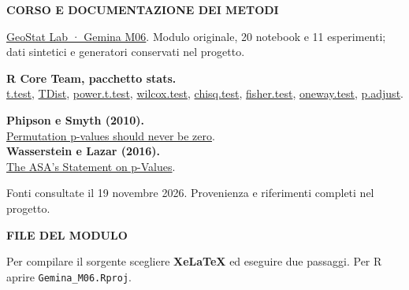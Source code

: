 \documentclass[12pt,aspectratio=1610]{beamer}
\newcommand{\PLabel}[1]{\par{\color{Classical}\bfseries\fontsize{9}{11}\selectfont\MakeUppercase{#1}}\par\vspace{1.8mm}}
\newcommand{\PBody}[1]{\par{\fontsize{11.3}{14.8}\selectfont #1\par}}
\newcommand{\PSmall}[1]{\par{\fontsize{9.8}{13.1}\selectfont #1\par}}
\newcommand{\PInfo}[1]{%
\begin{tcolorbox}[enhanced,arc=1.6mm,boxrule=.55pt,colback=GeoTint,
 colframe=Rule!80!Classical,left=2.3mm,right=2.3mm,top=2mm,bottom=2mm,
 before skip=1mm,after skip=1mm]
\PSmall{#1}\end{tcolorbox}}
\begin{document}
\begin{lrbox}{\PilotLeftBox}%
\begin{minipage}[t]{10.05cm}\raggedright\color{Ink}\fontsize{11.3}{14.8}\selectfont

\PLabel{Corso e documentazione dei metodi}
\PBody{\href{https://marzione00.github.io/Lab_Geo/\#modulo-M06}{GeoStat Lab · Gemina M06}. Modulo originale, 20 notebook e 11 esperimenti; dati sintetici e generatori conservati nel progetto.}
\vspace{3mm}
\PSmall{\textbf{R Core Team, pacchetto stats.}\\
\href{https://stat.ethz.ch/R-manual/R-devel/library/stats/html/t.test.html}{t.test},
\href{https://stat.ethz.ch/R-manual/R-devel/library/stats/html/TDist.html}{TDist},
\href{https://stat.ethz.ch/R-manual/R-devel/library/stats/html/power.t.test.html}{power.t.test},
\href{https://stat.ethz.ch/R-manual/R-devel/library/stats/html/wilcox.test.html}{wilcox.test},
\href{https://stat.ethz.ch/R-manual/R-devel/library/stats/html/chisq.test.html}{chisq.test},
\href{https://stat.ethz.ch/R-manual/R-devel/library/stats/html/fisher.test.html}{fisher.test},
\href{https://stat.ethz.ch/R-manual/R-devel/library/stats/html/oneway.test.html}{oneway.test},
\href{https://stat.ethz.ch/R-manual/R-devel/library/stats/html/p.adjust.html}{p.adjust}.}
\vspace{3mm}
\PSmall{\textbf{Phipson e Smyth (2010).}\\
\href{https://gksmyth.github.io/pubs/PermPValuesPreprint.pdf}{Permutation p-values should never be zero}.\\
\textbf{Wasserstein e Lazar (2016).}\\
\href{https://doi.org/10.1080/00031305.2016.1154108}{The ASA’s Statement on p-Values}.}
\vspace{2mm}
\PSmall{Fonti consultate il 19 novembre 2026. Provenienza e riferimenti completi nel progetto.}

\end{minipage}%
\end{lrbox}
\begin{lrbox}{\PilotRightBox}%
\begin{minipage}[t]{7.55cm}\raggedright\color{Ink}\fontsize{11.3}{14.8}\selectfont

\PLabel{File del modulo}
\PInfo{Per compilare il sorgente scegliere \textbf{XeLaTeX} ed eseguire due passaggi. Per R aprire \texttt{Gemina\_M06.Rproj}.}

\end{minipage}%
\end{lrbox}
\end{document}
